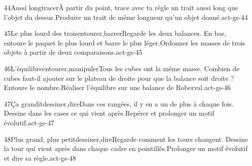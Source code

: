 \begin{activite}{44}{Aussi long}{tracer}{À partir du point, trace avec ta règle un trait {\otBold\color{otNavy}aussi long} que l’objet du dessus.}{Produire un trait de même longueur qu’un objet donné.}{act-gs-44}
\end{activite}
\begin{activite}{45}{Le plus lourd des trois}{entourer,barrer}{Regarde les deux balances. En bas, {\otBold\color{otNavy}entoure} le paquet le plus lourd et {\otBold\color{otNavy}barre} le plus léger.}{Ordonner les masses de trois objets à partir de deux comparaisons.}{act-gs-45}
\end{activite}
\begin{activite}{46}{L’équilibre}{entourer,manipuler}{Tous les cubes ont la même masse. Combien de cubes faut-il {\otBold\color{otNavy}ajouter} sur le plateau de droite pour que la balance soit droite ? Entoure le nombre.}{Réaliser l’équilibre sur une balance de Roberval.}{act-gs-46}
\end{activite}
\begin{activite}{47}{Ça grandit}{dessiner,dire}{Dans ces rangées, il y en a {\otBold\color{otNavy}un de plus à chaque fois}. Dessine dans les cases ce qui vient après.}{Repérer et prolonger un motif évolutif.}{act-gs-47}
\end{activite}
\begin{activite}{48}{Plus grand, plus petit}{dessiner,dire}{Regarde comment les tours changent. {\otBold\color{otNavy}Dessine} la tour qui vient après dans chaque cadre en pointillés.}{Prolonger un motif évolutif et dire sa règle.}{act-gs-48}
\end{activite}
